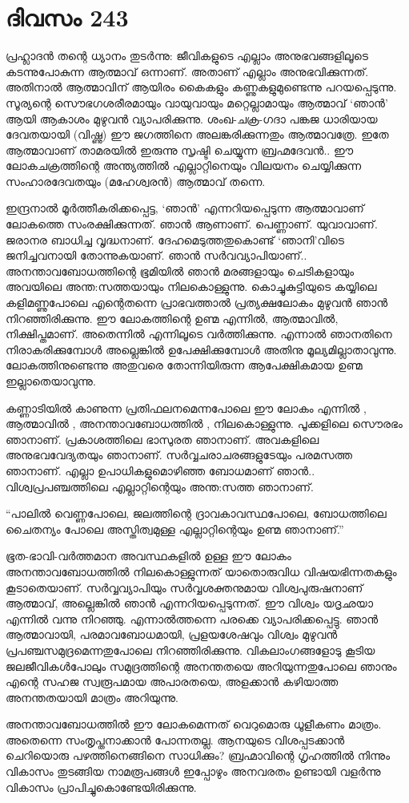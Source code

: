 \section{ദിവസം 243}


പ്രഹ്ലാദന്‍ തന്റെ ധ്യാനം തുടര്‍ന്നു: ജീവികളുടെ എല്ലാം അനുഭവങ്ങളിലൂടെ കടന്നുപോകുന്ന ആത്മാവ് ഒന്നാണ്. അതാണ്‌ എല്ലാം അനുഭവിക്കുന്നത്. അതിനാല്‍ ആത്മാവിന് ആയിരം കൈകളും കണ്ണുകളുമുണ്ടെന്നു പറയപ്പെടുന്നു. സൂര്യന്റെ സൌഭഗശരീരമായും വായുവായും മറ്റെല്ലാമായും ആത്മാവ് ‘ഞാന്‍’ ആയി ആകാശം മുഴുവന്‍ വ്യാപരിക്കുന്നു. ശംഖ-ചക്ര-ഗദാ പങ്കജ ധാരിയായ ദേവതയായി (വിഷ്ണു) ഈ ജഗത്തിനെ അലങ്കരിക്കുന്നതും ആത്മാവത്രേ. ഇതേ ആത്മാവാണ് താമരയില്‍ ഇരുന്നു സൃഷ്ടി ചെയ്യുന്ന ബ്രഹ്മദേവന്‍.. ഈ ലോകചക്രത്തിന്റെ അന്ത്യത്തില്‍ എല്ലാറ്റിനെയും വിലയനം ചെയ്യിക്കുന്ന സംഹാരദേവതയും (മഹേശ്വരന്‍)  ആത്മാവ്‌ തന്നെ.
  
ഇന്ദ്രനാല്‍ മൂര്‍ത്തീകരിക്കപ്പെട്ട, ‘ഞാന്‍’ എന്നറിയപ്പെടുന്ന ആത്മാവാണ് ലോകത്തെ സംരക്ഷിക്കുന്നത്. ഞാന്‍ ആണാണ്. പെണ്ണാണ്. യുവാവാണ്. ജരാനര ബാധിച്ച വൃദ്ധനാണ്. ദേഹമെടുത്തതുകൊണ്ട് ‘ഞാനി’വിടെ ജനിച്ചവനായി തോന്നുകയാണ്. ഞാന്‍ സര്‍വവ്യാപിയാണ്‌.. അനന്താവബോധത്തിന്റെ ഭൂമിയില്‍ ഞാന്‍ മരങ്ങളായും ചെടികളായും അവയിലെ അന്ത:സത്തയായും നിലകൊള്ളുന്നു. കൊച്ചുകുട്ടിയുടെ കയ്യിലെ കളിമണ്ണുപോലെ എന്റെതന്നെ പ്രാഭവത്താല്‍ പ്രത്യക്ഷലോകം മുഴുവന്‍ ഞാന്‍ നിറഞ്ഞിരിക്കുന്നു. ഈ ലോകത്തിന്റെ ഉണ്മ എന്നില്‍, ആത്മാവില്‍,  നിക്ഷിപ്തമാണ്. അതെന്നില്‍ എന്നിലൂടെ വര്‍ത്തിക്കുന്നു. എന്നാല്‍ ഞാനതിനെ നിരാകരിക്കുമ്പോള്‍ അല്ലെങ്കില്‍ ഉപേക്ഷിക്കുമ്പോള്‍ അതിനു മൂല്യമില്ലാതാവുന്നു. ലോകത്തിനുണ്ടെന്നു അതുവരെ തോന്നിയിരുന്ന ആപേക്ഷികമായ ഉണ്മ ഇല്ലാതെയാവുന്നു.
  
കണ്ണാടിയില്‍ കാണുന്ന പ്രതിഫലനമെന്നപോലെ ഈ ലോകം എന്നില്‍ , ആത്മാവില്‍ , അനന്താവബോധത്തില്‍ , നിലകൊള്ളുന്നു. പൂക്കളിലെ സൌരഭം ഞാനാണ്. പ്രകാശത്തിലെ ഭാസുരത ഞാനാണ്. അവകളിലെ അനുഭവവേദ്യതയും ഞാനാണ്. സര്‍വ്വചരാചരങ്ങളുടേയും പരമസത്ത ഞാനാണ്. എല്ലാ ഉപാധികളുമൊഴിഞ്ഞ ബോധമാണ് ഞാന്‍.. വിശ്വപ്രപഞ്ചത്തിലെ എല്ലാറ്റിന്റെയും അന്ത:സത്ത ഞാനാണ്.

“പാലില്‍ വെണ്ണപോലെ, ജലത്തിന്റെ ദ്രാവകാവസ്ഥപോലെ, ബോധത്തിലെ ചൈതന്യം പോലെ അസ്തിത്വമുള്ള എല്ലാറ്റിന്റെയും ഉണ്മ ഞാനാണ്.”
  
ഭൂത-ഭാവി-വര്‍ത്തമാന അവസ്ഥകളില്‍ ഉള്ള ഈ ലോകം അനന്താവബോധത്തില്‍ നിലകൊള്ളുന്നത് യാതൊരുവിധ വിഷയഭിന്നതകളും കൂടാതെയാണ്. സര്‍വ്വവ്യാപിയും സര്‍വ്വശക്തനുമായ വിശ്വപുരുഷനാണ് ആത്മാവ്, അല്ലെങ്കില്‍ ഞാന്‍ എന്നറിയപ്പെടുന്നത്. ഈ വിശ്വം യദൃഛയാ എന്നില്‍ വന്നു നിറഞ്ഞു. എന്നാല്‍ത്തന്നെ  പരക്കെ വ്യാപരിക്കപ്പെട്ടു. ഞാന്‍ ആത്മാവായി, പരമാവബോധമായി, പ്രളയശേഷവും  വിശ്വം മുഴുവന്‍ പ്രപഞ്ചസമുദ്രമെന്നതുപോലെ നിറഞ്ഞിരിക്കുന്നു. വികലാംഗങ്ങളോടു കൂടിയ ജലജീവികള്‍പോലും സമുദ്രത്തിന്റെ അനന്തതയെ അറിയുന്നതുപോലെ ഞാനും എന്റെ സഹജ സ്വരൂപമായ  അപാരതയെ, അളക്കാന്‍ കഴിയാത്ത അനന്തതയായി മാത്രം അറിയുന്നു.

അനന്താവബോധത്തില്‍ ഈ ലോകമെന്നത് വെറുമൊരു ധൂളീകണം മാത്രം. അതെന്നെ സംതൃപ്തനാക്കാന്‍ പോന്നതല്ല. ആനയുടെ വിശപ്പടക്കാന്‍ ചെറിയൊരു പഴത്തിനെങ്ങിനെ സാധിക്കും? ബ്രഹ്മാവിന്റെ ഗൃഹത്തില്‍ നിന്നും വികാസം തുടങ്ങിയ നാമരൂപങ്ങള്‍ ഇപ്പോഴും അനവരതം ഉണ്ടായി വളര്‍ന്നു വികാസം പ്രാപിച്ചുകൊണ്ടേയിരിക്കുന്നു.

